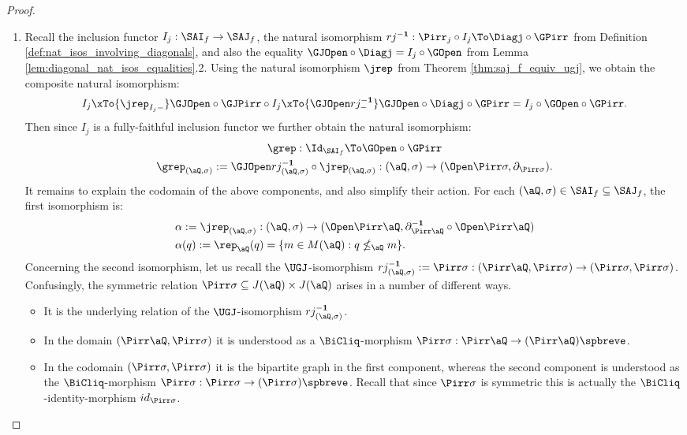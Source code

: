 \documentclass{article}
\begin{document}
\begin{proof}
\item
\begin{enumerate}
\item
Recall the inclusion functor $I_j : \SAI_f \to \SAJ_f$, the natural isomorphism $rj^{\bf-1} : \Pirr_j \circ I_j \To \Diagj \circ \GPirr$ from Definition \ref{def:nat_isos_involving_diagonals}, and also the equality $\GJOpen \circ \Diagj = I_j \circ \GOpen$ from Lemma \ref{lem:diagonal_nat_isos_equalities}.2. Using the natural isomorphism $\jrep$ from Theorem \ref{thm:saj_f_equiv_ugj}, we obtain the composite natural isomorphism:
\[
I_j \xTo{\jrep_{I_j -}} \GJOpen \circ \GJPirr \circ I_j
\xTo{\GJOpen rj_-^{\bf-1}} \GJOpen \circ \Diagj \circ \GPirr
= I_j \circ \GOpen \circ \GPirr.
\]
Then since $I_j$ is a fully-faithful inclusion functor we further obtain the natural isomorphism:
\[
\begin{tabular}{c}
$\grep : \Id_{\SAI_f} \To \GOpen \circ \GPirr$
\\[1ex]
$\grep_{(\aQ,\sigma)} := \GJOpen rj_{(\aQ,\sigma)}^{\bf-1} \circ \jrep_{(\aQ,\sigma)} : (\aQ,\sigma) \to (\Open\Pirr\sigma,\partial_{\Pirr\sigma})$.
\end{tabular}
\]
It remains to explain the codomain of the above components, and also simplify their action. For each $(\aQ,\sigma) \in \SAI_f \subseteq \SAJ_f$, the first isomorphism is:
\[
\begin{tabular}{lll}
$\alpha := \jrep_{(\aQ,\sigma)} : (\aQ,\sigma) \to (\Open\Pirr\aQ,\partial_{\Pirr\aQ}^{\bf-1} \circ \Open\Pirr\aQ)$
\\[1ex]
$\alpha(q) := \rep_\aQ(q) = \{ m \in M(\aQ) : q \nleq_\aQ m \}$.
\end{tabular}
\]
Concerning the second isomorphism, let us recall the $\UGJ$-isomorphism $rj_{(\aQ,\sigma)}^{\bf-1} := \Pirr\sigma : (\Pirr\aQ,\Pirr\sigma) \to (\Pirr\sigma,\Pirr\sigma)$. Confusingly, the symmetric relation $\Pirr\sigma \subseteq J(\aQ) \times J(\aQ)$ arises in a number of different ways.
\begin{itemize}
\item
It is the underlying relation of the $\UGJ$-isomorphism $rj_{(\aQ,\sigma)}^{\bf-1}$.
\item
In the domain $(\Pirr\aQ,\Pirr\sigma)$ it is understood as a $\BiCliq$-morphism $\Pirr\sigma : \Pirr\aQ \to (\Pirr\aQ)\spbreve$.
\item
In the codomain $(\Pirr\sigma,\Pirr\sigma)$ it is the bipartite graph in the first component, whereas the second component is understood as the $\BiCliq$-morphism $\Pirr\sigma : \Pirr\sigma \to (\Pirr\sigma)\spbreve$. Recall that since $\Pirr\sigma$ is symmetric this is actually the $\BiCliq$-identity-morphism $id_{\Pirr\sigma}$.
\end{itemize}


\end{enumerate}
\end{proof}
\end{document}

